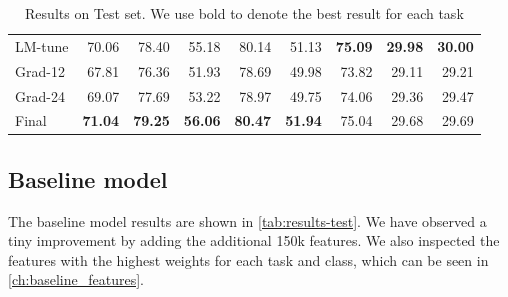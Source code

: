 \begin{table}[h]
{\begin{tabular}{lrrrrrrrr}
            LM-tune  & 70.06                      & 78.40                        & 55.18                      & 80.14                           & 51.13          & \textbf{75.09} & \textbf{29.98} & \textbf{30.00} \\
            Grad-12  & 67.81                      & 76.36                        & 51.93                      & 78.69                           & 49.98          & 73.82          & 29.11          & 29.21          \\
            Grad-24  & 69.07                      & 77.69                        & 53.22                      & 78.97                           & 49.75          & 74.06          & 29.36          & 29.47          \\
            \addlinespace
            Final    & \textbf{71.04}             & \textbf{79.25}               & \textbf{56.06}             & \textbf{80.47}                  & \textbf{51.94} & 75.04          & 29.68          & 29.69          \\
            \bottomrule
        \end{tabular}
        \caption{Results on Test set. We use bold to denote the best result for each task}
        \label{tab:results-test}
    }
\end{table}

\subsection{Baseline model}
\label{sec:baseline}
The baseline model results are shown in \autoref{tab:results-test}.
We have observed a tiny improvement by adding the additional 150k features.
We also inspected the features with the highest weights for each task and class, which
can be seen in \autoref{ch:baseline_features}.


